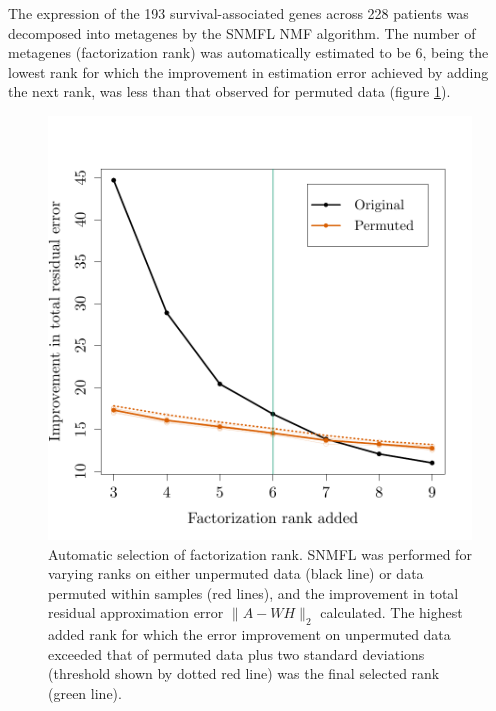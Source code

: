 \documentclass[dissertation.tex]{subfiles}
\begin{document}

The expression of the 193 survival-associated genes across 228 patients was decomposed into metagenes by the \gls{SNMFL} \gls{NMF} algorithm.  The number of metagenes (factorization rank) was automatically estimated to be 6, being the lowest rank for which the improvement in estimation error achieved by adding the next rank, was less than that observed for permuted data (figure \ref{fig:sig_nmf_rank}).

\begin{figure}
\centering
\includegraphics[width=.7\linewidth]{analysis/biosurv/reports/18_SIS_diag_dsd_final/figure/nmf-rank-plots-2}
\caption{Automatic selection of factorization rank.  \acrshort{SNMFL} was performed for varying ranks on either unpermuted data (black line) or data permuted within samples (red lines), and the improvement in total residual approximation error $\|A - W H\|_2$ calculated.  The highest added rank for which the error improvement on unpermuted data exceeded that of permuted data plus two standard deviations (threshold shown by dotted red line) was the final selected rank (green line).}
\label{fig:sig_nmf_rank}
\end{figure}
\end{document}
